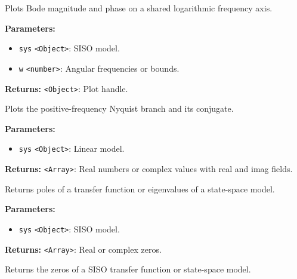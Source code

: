 \documentclass[12pt,a4paper]{article}
\begin{document}
\noindent Plots Bode magnitude and phase on a shared logarithmic frequency axis.

\vspace{5mm}
\noindent {}


\noindent \textbf{Parameters:}
\begin{itemize}
  \item \texttt{sys} \texttt{<Object>}: SISO model.
  \item \texttt{w} \texttt{<number>}: Angular frequencies or bounds.
\end{itemize}

\noindent \textbf{Returns:} \texttt{<Object>}: Plot handle.

\noindent Plots the positive-frequency Nyquist branch and its conjugate.

\vspace{5mm}
\noindent {}


\noindent \textbf{Parameters:}
\begin{itemize}
  \item \texttt{sys} \texttt{<Object>}: Linear model.
\end{itemize}

\noindent \textbf{Returns:} \texttt{<Array>}: Real numbers or complex values with real and imag fields.

\noindent Returns poles of a transfer function or eigenvalues of a state-space model.

\vspace{5mm}
\noindent {}


\noindent \textbf{Parameters:}
\begin{itemize}
  \item \texttt{sys} \texttt{<Object>}: SISO model.
\end{itemize}

\noindent \textbf{Returns:} \texttt{<Array>}: Real or complex zeros.

\noindent Returns the zeros of a SISO transfer function or state-space model.

\vspace{5mm}
\noindent {}
\end{document}
